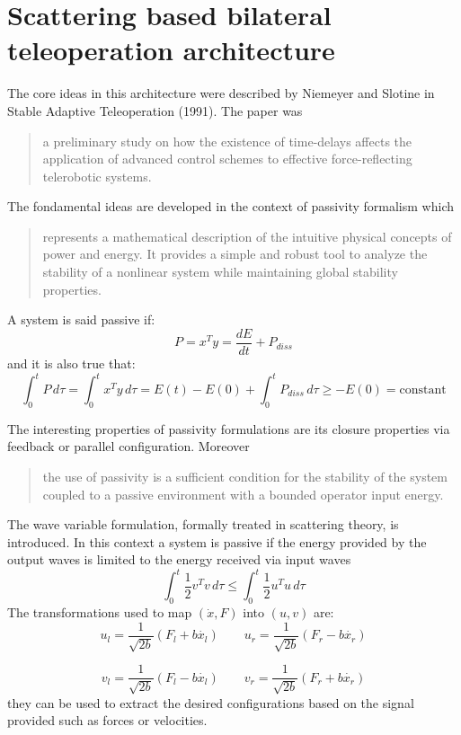 \documentclass[a4paper,12pt]{article}
\begin{document}
\section{Scattering based bilateral teleoperation architecture}
The core ideas in this architecture were described by Niemeyer and Slotine in Stable Adaptive Teleoperation (1991). The paper was \begin{quote}
    a preliminary study on how the existence of time-delays affects the application of advanced control schemes to effective force-reflecting telerobotic systems.
\end{quote}

The fondamental ideas are developed in the context of passivity formalism which
\begin{quote}
    represents a mathematical description of the intuitive physical concepts of power and energy. It provides a simple and robust tool to analyze the stability of a nonlinear system while maintaining global stability properties.
\end{quote}
A system is said passive if:
\[
    P = x^Ty = \frac{dE}{dt} + P_{diss}
\]
and it is also true that:
\[
    \int_{0}^{t} P \,d\tau = \int_{0}^{t} x^Ty \,d\tau = E(t) - E(0) + \int_{0}^{t} P_{diss} \,d\tau \geq -E(0) = \text{constant}
\]

\noindent The interesting properties of passivity formulations are its closure properties via feedback or parallel configuration. Moreover 

\begin{quote}
    the use of passivity is a sufficient condition for the stability of the system coupled to a passive environment with a bounded operator input energy.
\end{quote}

\noindent The wave variable formulation, formally treated in scattering theory, is introduced. In this context a system is passive if the energy provided by the output waves is limited to the energy received via input waves
\[
    \int_{0}^{t} \frac{1}{2}v^Tv \,d\tau \leq \int_{0}^{t} \frac{1}{2}u^Tu \,d\tau 
\]
The transformations used to map $(\dot{x},F)$ into $(u,v)$ are:
\[
    u_l = \frac{1}{\sqrt{2b}}(F_l + b \dot{x_l}) \qquad u_r = \frac{1}{\sqrt{2b}}(F_r - b \dot{x_r}) 
\]

\[
    v_l = \frac{1}{\sqrt{2b}}(F_l - b \dot{x_l}) \qquad v_r = \frac{1}{\sqrt{2b}}(F_r + b \dot{x_r}) 
\]
they can be used to extract the desired configurations based on the signal provided such as forces or velocities.
\end{document}
